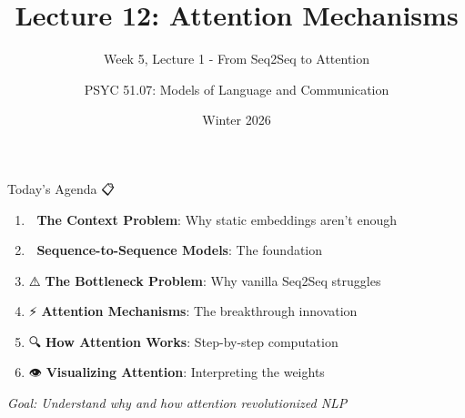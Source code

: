 \documentclass[aspectratio=169]{beamer}
\title{Lecture 12: Attention Mechanisms}
\subtitle{Week 5, Lecture 1 - From Seq2Seq to Attention}
\author{PSYC 51.07: Models of Language and Communication}
\date{Winter 2026}
\begin{document}
\begin{frame}[shrink=10]
\titlepage
\end{frame}

\begin{frame}[shrink=10]{Today's Agenda 📋}
\large
\begin{enumerate}\setlength{\itemsep}{0pt}
    \item 🤔 \textbf{The Context Problem}: Why static embeddings aren't enough
    \item 🔄 \textbf{Sequence-to-Sequence Models}: The foundation
    \item ⚠️ \textbf{The Bottleneck Problem}: Why vanilla Seq2Seq struggles
    \item ⚡ \textbf{Attention Mechanisms}: The breakthrough innovation
    \item 🔍 \textbf{How Attention Works}: Step-by-step computation
    \item 👁️ \textbf{Visualizing Attention}: Interpreting the weights
\end{enumerate}

\vspace{1em}
\textit{Goal: Understand why and how attention revolutionized NLP}
\end{frame}
\end{document}
